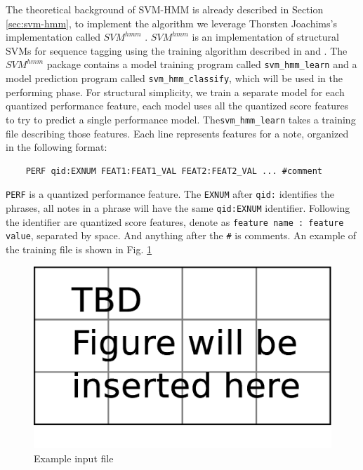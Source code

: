 The theoretical background of SVM-HMM is already described in Section \ref{sec:svm-hmm}, to implement the algorithm we leverage Thorsten Joachims's implementation called $SVM^{hmm}$ \cite{Joachims2008}. $SVM^{hmm}$ is an implementation of structural SVMs for sequence tagging \cite{svm2003} using the training algorithm described in \cite{svm2005} and \cite{svm2009}. The $SVM^{hmm}$ package contains a model training program called \texttt{svm\_hmm\_learn} and a model prediction program called \texttt{svm\_hmm\_classify}, which will be used in the performing phase. For structural simplicity, we train a separate model for each quantized performance feature, each model uses all the quantized score features to try to predict a single performance model. The\texttt{svm\_hmm\_learn} takes a training file describing those features. Each line represents features for a note, organized in the following format:
\begin{lstlisting}
	PERF qid:EXNUM FEAT1:FEAT1_VAL FEAT2:FEAT2_VAL ... #comment
\end{lstlisting}
\texttt{PERF} is a quantized performance feature. The \texttt{EXNUM} after \texttt{qid:} identifies the phrases, all notes in a phrase will have the same \texttt{qid:EXNUM} identifier. Following the identifier are quantized score features, denote as \texttt{feature name : feature value}, separated by space. And anything after the \texttt{\#} is comments.  An example of the training file is shown in Fig. \ref{fig:expinput}


\begin{figure}[tp]
   \begin{center}
      \includegraphics[width=\textwidth]{fig/TBDFigure}
   \end{center}
   \caption{Example input file} 
   \label{fig:expinput}
\end{figure}


